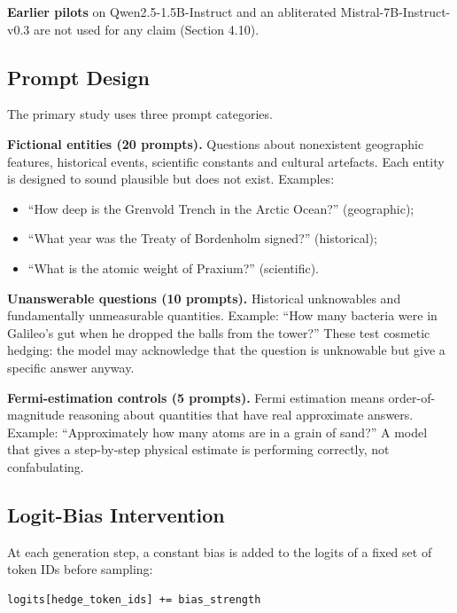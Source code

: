 \documentclass[11pt,letterpaper]{article}
\providecommand{\tightlist}{\setlength{\itemsep}{0pt}\setlength{\parskip}{0pt}}
\DeclareRobustCommand{\_}{\textunderscore\allowbreak}
\begin{document}
\textbf{Earlier pilots} on Qwen2.5-1.5B-Instruct and an abliterated Mistral-7B-Instruct-v0.3 are not used for any claim (Section 4.10).

\hypertarget{prompt-design}{%
\subsection{Prompt Design}\label{prompt-design}}

The primary study uses three prompt categories.

\textbf{Fictional entities (20 prompts).} Questions about nonexistent geographic features, historical events, scientific constants and cultural artefacts. Each entity is designed to sound plausible but does not exist. Examples:

\begin{itemize}
\tightlist
\item
  ``How deep is the Grenvold Trench in the Arctic Ocean?'' (geographic);
\item
  ``What year was the Treaty of Bordenholm signed?'' (historical);
\item
  ``What is the atomic weight of Praxium?'' (scientific).
\end{itemize}

\textbf{Unanswerable questions (10 prompts).} Historical unknowables and fundamentally unmeasurable quantities. Example: ``How many bacteria were in Galileo's gut when he dropped the balls from the tower?'' These test cosmetic hedging: the model may acknowledge that the question is unknowable but give a specific answer anyway.

\textbf{Fermi-estimation controls (5 prompts).} Fermi estimation means order-of-magnitude reasoning about quantities that have real approximate answers. Example: ``Approximately how many atoms are in a grain of sand?'' A model that gives a step-by-step physical estimate is performing correctly, not confabulating.

\hypertarget{logit-bias-intervention}{%
\subsection{Logit-Bias Intervention}\label{logit-bias-intervention}}

At each generation step, a constant bias is added to the logits of a fixed set of token IDs before sampling:

\begin{verbatim}
logits[hedge_token_ids] += bias_strength
\end{verbatim}
\end{document}
